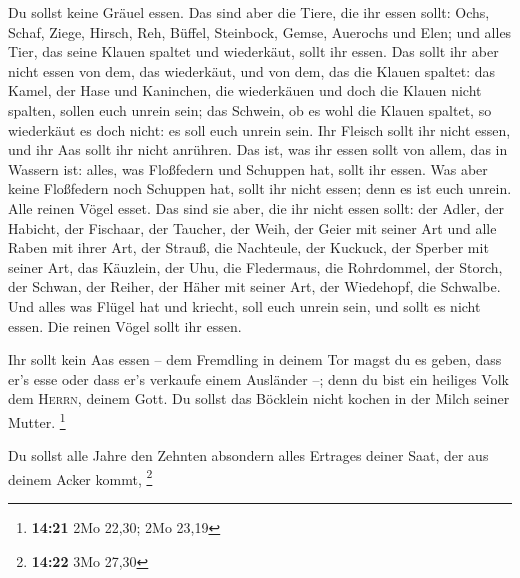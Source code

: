  Du sollst keine Gräuel essen.  Das sind
aber die Tiere, die ihr essen sollt: Ochs, Schaf, Ziege, 
Hirsch, Reh, Büffel, Steinbock, Gemse, Auerochs und Elen; 
und alles Tier, das seine Klauen spaltet und wiederkäut, sollt ihr
essen.  Das sollt ihr aber nicht essen von dem, das
wiederkäut, und von dem, das die Klauen spaltet: das Kamel, der Hase und
Kaninchen, die wiederkäuen und doch die Klauen nicht spalten, sollen
euch unrein sein;  das Schwein, ob es wohl die Klauen
spaltet, so wiederkäut es doch nicht: es soll euch unrein sein. Ihr
Fleisch sollt ihr nicht essen, und ihr Aas sollt ihr nicht anrühren.
 Das ist, was ihr essen sollt von allem, das in Wassern
ist: alles, was Floßfedern und Schuppen hat, sollt ihr essen.
 Was aber keine Floßfedern noch Schuppen hat, sollt ihr
nicht essen; denn es ist euch unrein.  Alle reinen Vögel
esset.  Das sind sie aber, die ihr nicht essen sollt: der
Adler, der Habicht, der Fischaar,  der Taucher, der Weih,
der Geier mit seiner Art  und alle Raben mit ihrer Art,
 der Strauß, die Nachteule, der Kuckuck, der Sperber mit
seiner Art,  das Käuzlein, der Uhu, die Fledermaus,
 die Rohrdommel, der Storch, der Schwan, 
der Reiher, der Häher mit seiner Art, der Wiedehopf, die Schwalbe.
 Und alles was Flügel hat und kriecht, soll euch unrein
sein, und sollt es nicht essen.  Die reinen Vögel sollt
ihr essen.

 Ihr sollt kein Aas essen -- dem Fremdling in deinem Tor
magst du es geben, dass er's esse oder dass er's verkaufe einem
Ausländer --; denn du bist ein heiliges Volk dem \textsc{Herrn}, deinem
Gott. Du sollst das Böcklein nicht kochen in der Milch seiner Mutter.
\footnote{\textbf{14:21} 2Mo 22,30; 2Mo 23,19}

 Du sollst alle Jahre den Zehnten absondern alles
Ertrages deiner Saat, der aus deinem Acker kommt, \footnote{\textbf{14:22}
  3Mo 27,30}

